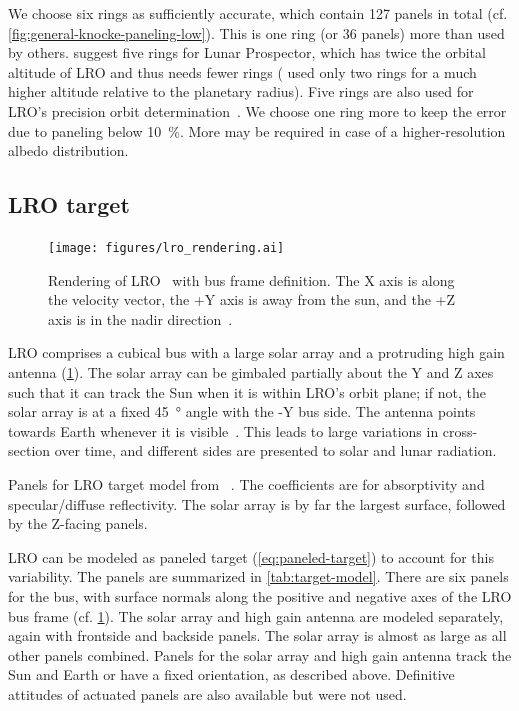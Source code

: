 We choose six rings as sufficiently accurate, which contain 127 panels in total (cf. \cref{fig:general-knocke-paneling-low}). This is one ring (or 36 panels) more than used by others. \citeauthor{Floberghagen1999} suggest five rings for Lunar Prospector, which has twice the orbital altitude of \gls{LRO} and thus needs fewer rings (\citeauthor{Knocke1988} used only two rings for a much higher altitude relative to the planetary radius). Five rings are also used for \gls{LRO}'s precision orbit determination~\cite{Nicholson2010}. We choose one ring more to keep the error due to paneling below \qty{10}{\percent}. More may be required in case of a higher-resolution albedo distribution.




\subsection{LRO target}
\label{subsec:lro-target}

\begin{figure}[t]
    \centering
    \texttt{[image: figures/lro\_rendering.ai]}
    \caption{Rendering of \gls{LRO}~\cite{NSMD2018} with bus frame definition. The X axis is along the velocity vector, the +Y axis is away from the sun, and the +Z axis is in the nadir direction~\cite{Tooley2010}.}
    \label{fig:lro-rendering}
\end{figure}

\gls{LRO} comprises a cubical bus with a large solar array and a protruding high gain antenna (\cref{fig:lro-rendering}). The solar array can be gimbaled partially about the Y and Z axes such that it can track the Sun when it is within \gls{LRO}'s orbit plane; if not, the solar array is at a fixed \qty{45}{\degree} angle with the -Y bus side. The antenna points towards Earth whenever it is visible~\cite{Mazarico2018}. This leads to large variations in cross-section over time, and different sides are presented to solar and lunar radiation.


\begin{table}[b]
    \centering
    \caption{Panels for \gls{LRO} target model from \citeauthor{Smith2008}~\cite{Smith2008}. The coefficients are for absorptivity and specular/diffuse reflectivity. The solar array is by far the largest surface, followed by the Z-facing panels.}
    \label{tab:target-model}
    
\end{table}

\gls{LRO} can be modeled as paneled target (\cref{eq:paneled-target}) to account for this variability. The panels are summarized in \cref{tab:target-model}. There are six panels for the bus, with surface normals along the positive and negative axes of the \gls{LRO} bus frame (cf. \cref{fig:lro-rendering}). The solar array and high gain antenna are modeled separately, again with frontside and backside panels. The solar array is almost as large as all other panels combined. Panels for the solar array and high gain antenna track the Sun and Earth or have a fixed orientation, as described above. Definitive attitudes of actuated panels are also available but were not used.

